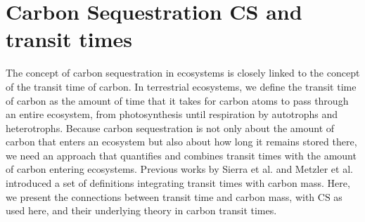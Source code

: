 \documentclass[9pt,twoside]{pnas-new}
\newcommand{\CS}{\mathrm{CS}}
\begin{document}
\setcounter{figure}{0}

\setcounter{table}{0}



\section{Carbon Sequestration CS and transit times}
The concept of carbon sequestration in ecosystems is closely linked to the concept of the transit time of carbon. In terrestrial ecosystems, we define the transit time of carbon as the amount of time that it takes for carbon atoms to pass through an entire ecosystem, from photosynthesis until respiration by autotrophs and heterotrophs. 
Because carbon sequestration is not only about the amount of carbon that enters an ecosystem but also about how long it remains stored there, we need an approach that quantifies and combines transit times with the amount of carbon entering ecosystems. Previous works by Sierra et al. \cite{Sierra2021} and Metzler et al. \cite{Metzler2024} introduced a set of definitions integrating transit times with carbon mass. 
Here, we present the connections between transit time and carbon mass, with $\CS$ as used here, and their underlying theory in carbon transit times.
\end{document}
